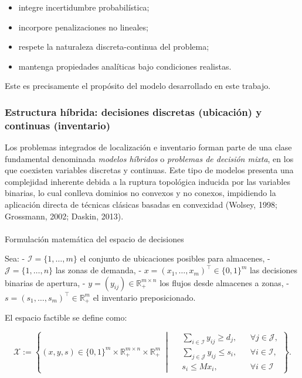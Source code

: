\documentclass[
  spanish,
  letterpaper,
  DIV=11,
  numbers=noendperiod]{scrartcl}
\makeatletter
\let\oldparagraph\paragraph
\renewcommand{\paragraph}{
    \@ifstar
      \xxxParagraphStar
      \xxxParagraphNoStar
  }
\newcommand{\xxxParagraphStar}[1]{\oldparagraph*{#1}\mbox{}}
\newcommand{\xxxParagraphNoStar}[1]{\oldparagraph{#1}\mbox{}}
\providecommand{\tightlist}{%
  \setlength{\itemsep}{0pt}\setlength{\parskip}{0pt}}
\makeatother
\begin{document}
\begin{itemize}
\tightlist
\item
  integre incertidumbre probabilística;
\item
  incorpore penalizaciones no lineales;
\item
  respete la naturaleza discreta-continua del problema;
\item
  mantenga propiedades analíticas bajo condiciones realistas.
\end{itemize}

Este es precisamente el propósito del modelo desarrollado en este
trabajo.

\subsubsection{Estructura híbrida: decisiones discretas (ubicación) y
continuas
(inventario)}\label{estructura-huxedbrida-decisiones-discretas-ubicaciuxf3n-y-continuas-inventario}

Los problemas integrados de localización e inventario forman parte de
una clase fundamental denominada \emph{modelos híbridos} o
\emph{problemas de decisión mixta}, en los que coexisten variables
discretas y continuas. Este tipo de modelos presenta una complejidad
inherente debida a la ruptura topológica inducida por las variables
binarias, lo cual conlleva dominios no convexos y no conexos, impidiendo
la aplicación directa de técnicas clásicas basadas en convexidad
(Wolsey, 1998; Grossmann, 2002; Daskin, 2013).

\paragraph{Formulación matemática del espacio de
decisiones}\label{formulaciuxf3n-matemuxe1tica-del-espacio-de-decisiones}

Sea: - \(\mathcal{I} = \{1,\ldots,m\}\) el conjunto de ubicaciones
posibles para almacenes, - \(\mathcal{J} = \{1,\ldots,n\}\) las zonas de
demanda, - \(x = (x_1,\dots,x_m)^\top \in \{0,1\}^m\) las decisiones
binarias de apertura, - \(y = (y_{ij}) \in \mathbb{R}_+^{m\times n}\)
los flujos desde almacenes a zonas, -
\(s = (s_1,\dots,s_m)^\top \in \mathbb{R}_+^m\) el inventario
preposicionado.

El espacio factible se define como:

\[
\mathcal{X} := 
\left\{
(x,y,s)\in \{0,1\}^m\times \mathbb{R}_+^{m\times n}\times \mathbb{R}_+^m \;\middle|\;
\begin{aligned}
&\sum_{i\in\mathcal{I}} y_{ij} \ge d_j, &&\forall j\in\mathcal{J},\\
&\sum_{j\in\mathcal{J}} y_{ij} \le s_i, &&\forall i\in\mathcal{I},\\
&s_i \le M x_i, &&\forall i\in\mathcal{I}
\end{aligned}
\right\}.
\tag{2.2}
\]
\end{document}
